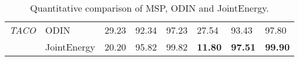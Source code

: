 \begin{table}[]
\begin{tabular}{clllllll}
\multicolumn{1}{c|}{\textit{TACO}}     & ODIN               & 29.23                         & 92.34                              & 97.23                 & 27.54                 & 93.43                & 97.80                \\
\multicolumn{1}{l|}{}                  & JointEnergy        & 20.20                         & 95.82                              & 99.82                 & \textbf{11.80}        & \textbf{97.51}       & \textbf{99.90}       \\ \hline
\end{tabular}
\caption{Quantitative comparison of MSP, ODIN and JointEnergy.}
\label{experiments:table1}
\end{table}

